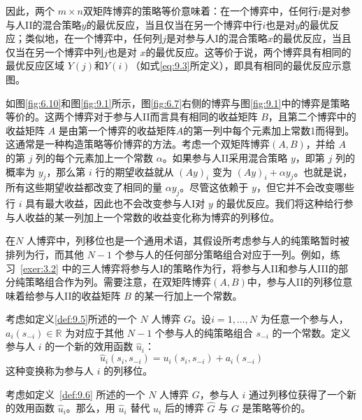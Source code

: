 因此，两个 \( m  \times  n \)双矩阵博弈的策略等价意味着：在一个博弈中，任何行$i$是对参与人II的混合策略$y$的最优反应，当且仅当在另一个博弈中行$i$也是对$y$的最优反应；类似地，在一个博弈中，任何列$j$是对参与人I的混合策略$x$的最优反应，当且仅当在另一个博弈中列$j$也是对 $x$的最优反应。这等价于说，两个博弈具有相同的最优反应区域 $Y(j)$和$Y(i)$（如式\eqref{eq:9.3}所定义），即具有相同的最优反应示意图。


如图\ref{fig:6.10}和图\ref{fig:9.1}所示，图\ref{fig:6.7}右侧的博弈与图\ref{fig:9.1}中的博弈是策略等价的。这两个博弈对于参与人II而言具有相同的收益矩阵 \(B\)，且第二个博弈中的收益矩阵 \(A\) 是由第一个博弈的收益矩阵\(A\)的第一列中每个元素加上常数1而得到。这通常是一种构造策略等价博弈的方法。考虑一个双矩阵博弈$(A,B)$，并给 \(A\) 的第 \(j\) 列的每个元素加上一个常数 \(\alpha\)。如果参与人II采用混合策略 \(y\)，即第 \(j\) 列的概率为 \({y}_{j}\)，那么第 \(i\) 行的期望收益就从 \({\left( Ay\right) }_{i}\) 变为 \({\left( Ay\right) }_{i} + \alpha {y}_{j}\)。也就是说，所有这些期望收益都改变了相同的量 \(\alpha {y}_{j}\)。尽管这依赖于 \(y\)，但它并不会改变哪些行 \(i\) 具有最大收益，因此也不会改变参与人I对 \(y\) 的最优反应。我们将这种给行参与人收益的某一列加上一个常数的收益变化称为博弈的列移位。

在\(N\) 人博弈中，列移位也是一个通用术语，其假设所考虑参与人的纯策略暂时被排列为行，而其他 \(N - 1\) 个参与人的任何部分策略组合对应于一列。例如，练习~\ref{exer:3.2} 中的三人博弈将参与人I的策略作为行，将参与人II和参与人III的部分纯策略组合作为列。需要注意，在双矩阵博弈$(A,B)$中，参与人II的列移位意味着给参与人II的收益矩阵 \(B\) 的某一行加上一个常数。



\begin{definition}\label{def:9.6}  %
考虑如定义\ref{def:9.5}所述的一个 \(N\) 人博弈 \(G\)。设\(i = 1,\ldots,N\) 为任意一个参与人，\({a}_{i}\left( {s}_{-i}\right)  \in  \mathbb{R}\) 为对应于其他 \(N - 1\) 个参与人的纯策略组合 \({s}_{-i}\) 的一个常数。定义参与人 \(i\) 的一个新的效用函数 \({\widehat{u}}_{i}\)：
\[
{\widehat{u}}_{i}\left( {{s}_{i},{s}_{-i}}\right)  = {u}_{i}\left( {{s}_{i},{s}_{-i}}\right)  + {a}_{i}\left( {s}_{-i}\right)
\]
这种变换称为参与人 \(i\) 的列移位。
\end{definition}


\begin{proposition}\label{prop:9.7}   %
考虑如定义~\ref{def:9.6} 所述的一个 \(N\) 人博弈 \(G\)，参与人 \(i\) 通过列移位获得了一个新的效用函数 \({\widehat{u}}_{i}\)。那么，用 \({\widehat{u}}_{i}\) 替代 \({u}_{i}\) 后的博弈 \(\widehat{G}\) 与 \(G\) 是策略等价的。
\end{proposition}

